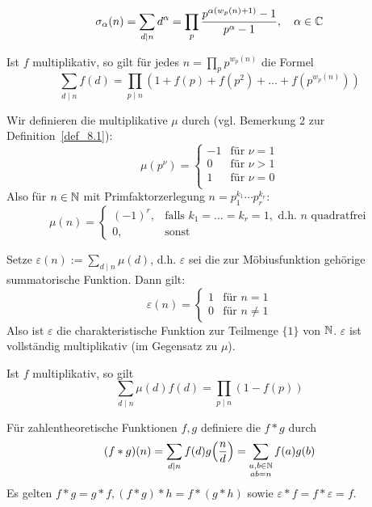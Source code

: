 	\[ \sigma_\alpha(n) = \sum\limits_{d \mid n} d^\alpha = \prod\limits_{p} \frac{p^{\alpha(w_p(n)+1)}-1}{p^\alpha - 1}, \quad \alpha \in \CC \index{Teilersummenfunktion}\]

\begin{falko} \label{F8.2}
	Ist $f$ multiplikativ, so gilt für jedes $n = \prod_p p^{w_p(n)}$ die Formel
	\[ \sum\limits_{d \mid n} f(d) = \prod\limits_{p \mid n} (1+f(p) + f(p^2) + \dots + f(p^{w_p(n)})) \]
\end{falko}

\begin{defn}[Möbiusfunktion] \label{def_8.2}
	Wir definieren die multiplikative  $\mu$ durch (vgl. Bemerkung 2 zur Definition~\ref{def_8.1}):
	\[ \mu(p^\nu) = \begin{cases}
		-1 & \text{für } \nu = 1 \\
		0 & \text{für } \nu > 1 \\
		1 & \text{für } \nu = 0 \\
	\end{cases} \]
	Also für $n \in \mathbb{N}$ mit Primfaktorzerlegung $n = p_1^{k_1} \cdots p_r^{k_r}$:
	\[ \mu(n) = \begin{cases}
		(-1)^r, & \text{falls } k_1 = \dots = k_r = 1, \text{ d.h. } n \text{ quadratfrei} \\
		0, & \text{sonst}
	\end{cases} \]
\end{defn}

\begin{falko} \label{F8.3}
	Setze $\varepsilon(n) := \sum\limits_{d \mid n} \mu(d)$, d.h. $\varepsilon$ sei die zur Möbiusfunktion gehörige summatorische Funktion. Dann gilt:
	\[ \varepsilon(n) = \begin{cases}
		1 & \text{für } n=1 \\
		0 & \text{für } n \neq 1
	\end{cases} \]
	Also ist $\varepsilon$ die charakteristische Funktion zur Teilmenge $\{1\}$ von $\mathbb{N}$. $\varepsilon$ ist vollständig multiplikativ (im Gegensatz zu $\mu$).
\end{falko}

\begin{falko} \label{F8.4}
	Ist $f$ multiplikativ, so gilt
	\[ \sum\limits_{d \mid n} \mu(d) f(d) = \prod\limits_{p \mid n} (1-f(p)) \]
\end{falko}

\begin{defn} \label{def_8.3}
	Für zahlentheoretische Funktionen $f,g$ definiere die  $f * g$ durch
	\[ (f * g)(n) = \sum\limits_{d \mid n} f(d) g\enbrace*{\frac{n}{d}} = \sum\limits_{\substack{a,b \in \NN \\ ab = n}} f(a) g(b) \]
	Es gelten $f * g = g*f, (f*g)*h = f*(g*h)$ sowie $\varepsilon*f = f*\varepsilon = f$.
\end{defn}

